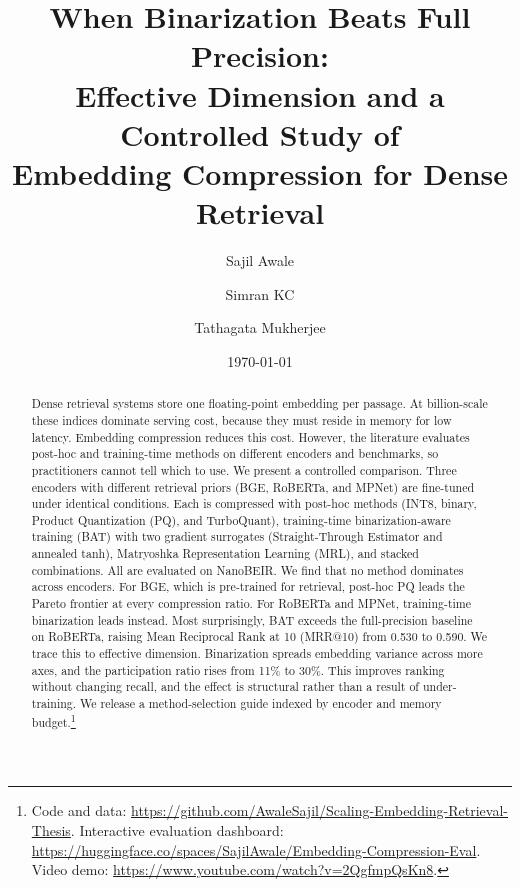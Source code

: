 \documentclass[11pt]{article}
\title{\bfseries When Binarization Beats Full Precision:\\[2pt]
Effective Dimension and a Controlled Study of\\ Embedding Compression for Dense Retrieval}
\author[1]{Sajil Awale}
\author[1]{Simran KC}
\author[1]{Tathagata Mukherjee}
\affil[1]{Department of Computer Science, The University of Alabama in Huntsville (UAH), Huntsville, AL, USA}
\date{\today}
\begin{document}
\maketitle

\begin{abstract}
\noindent
Dense retrieval systems store one floating-point embedding per passage.
At billion-scale these indices dominate serving cost, because they must
reside in memory for low latency. Embedding compression reduces this cost.
However, the literature evaluates post-hoc and training-time methods on
different encoders and benchmarks, so practitioners cannot tell which to
use. We present a controlled comparison. Three encoders with different
retrieval priors (BGE, RoBERTa, and MPNet) are fine-tuned under identical
conditions. Each is compressed with post-hoc methods (INT8, binary,
Product Quantization (PQ), and TurboQuant), training-time
binarization-aware training (BAT) with two gradient surrogates
(Straight-Through Estimator and annealed tanh), Matryoshka Representation
Learning (MRL), and stacked combinations. All are evaluated on NanoBEIR.
We find that no method dominates across encoders. For BGE, which is
pre-trained for retrieval, post-hoc PQ leads the Pareto frontier at every
compression ratio. For RoBERTa and MPNet, training-time binarization leads
instead. Most surprisingly, BAT exceeds the full-precision baseline on
RoBERTa, raising Mean Reciprocal Rank at 10 (MRR@10) from 0.530 to 0.590.
We trace this to effective dimension. Binarization spreads embedding
variance across more axes, and the participation ratio rises from 11\% to
30\%. This improves ranking without changing recall, and the effect is
structural rather than a result of under-training. We release a
method-selection guide indexed by encoder and memory budget.\footnote{Code and
data: \url{https://github.com/AwaleSajil/Scaling-Embedding-Retrieval-Thesis}.
Interactive evaluation dashboard:
\url{https://huggingface.co/spaces/SajilAwale/Embedding-Compression-Eval}. Video
demo: \url{https://www.youtube.com/watch?v=2QgfmpQsKn8}.}
\end{abstract}











\clearpage

\end{document}
